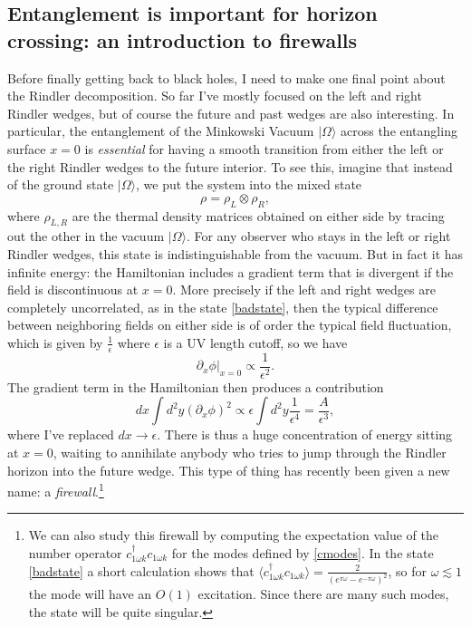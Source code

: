 \documentclass[12pt]{article}
\newcommand{\be}{\begin{equation}}
\newcommand{\ee}{\end{equation}}
\newcommand{\lan}{\langle}
\newcommand{\ran}{\rangle}
\begin{document}
\subsection{Entanglement is important for horizon crossing: an introduction to firewalls}\label{firewallsec}
Before finally getting back to black holes, I need to make one final point about the Rindler decomposition.  So far I've mostly focused on the left and right Rindler wedges, but of course the future and past wedges are also interesting.  In particular, the entanglement of the Minkowski Vacuum $|\Omega\ran$ across the entangling surface $x=0$ is \textit{essential} for having a smooth transition from either the left or the right Rindler wedges to the future interior.  To see this, imagine that instead of the ground state $|\Omega\ran$, we put the system into the mixed state
\be\label{badstate}
\rho=\rho_L\otimes \rho_R,
\ee
where $\rho_{L,R}$ are the thermal density matrices obtained on either side by tracing out the other in the vacuum $|\Omega\ran$.  For any observer who stays in the left or right Rindler wedges, this state is indistinguishable from the vacuum.  But in fact it has infinite energy: the Hamiltonian includes a gradient term that is divergent if the field is discontinuous at $x=0$.  More precisely if the left and right wedges are completely uncorrelated, as in the state \ref{badstate}, then the typical difference between neighboring fields on either side is of order the typical field fluctuation, which is given by $\frac{1}{\epsilon}$ where $\epsilon$ is a UV length cutoff, so we have
\be
\partial_x\phi|_{x=0}  \propto \frac{1}{\epsilon^2}.
\ee
The gradient term in the Hamiltonian then produces a contribution 
\be
dx \int d^2 y (\partial_x\phi)^2\propto\epsilon\int d^2 y  \frac{1}{\epsilon^4}=\frac{A}{\epsilon^3},
\ee 
where I've replaced $dx\to\epsilon$.  There is thus a huge concentration of energy sitting at $x=0$, waiting to annihilate anybody who tries to jump through the Rindler horizon into the future wedge.  This type of thing has recently been given a new name: a \textit{firewall}.\footnote{We can also study this firewall by computing the expectation value of the number operator $c_{1\omega k}^\dagger c_{1\omega k}$ for the modes defined by \eqref{cmodes}.  In the state \eqref{badstate} a short calculation shows that $\lan c_{1\omega k}^\dagger c_{1\omega k}\ran=\frac{2}{\left(e^{\pi \omega}-e^{-\pi \omega}\right)^2}$, so for $\omega\lesssim 1$ the mode will have an $O(1)$ excitation.  Since there are many such modes, the state will be quite singular.}
\end{document}
